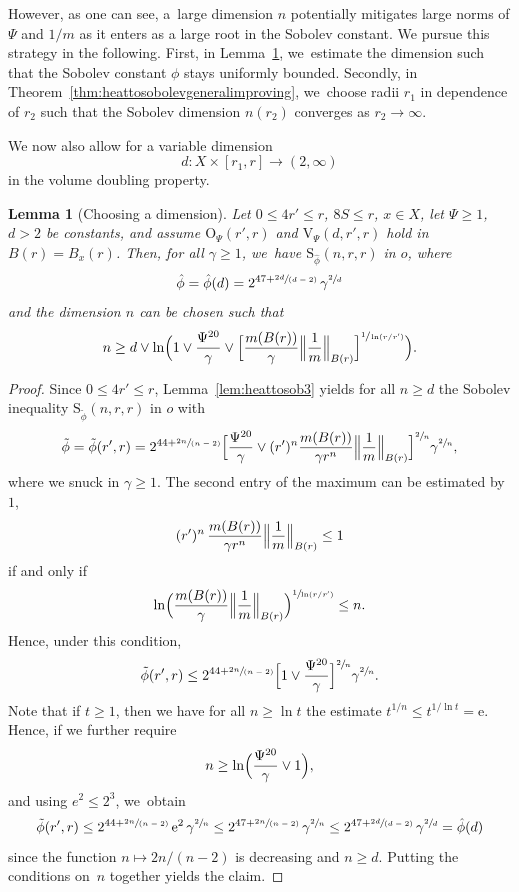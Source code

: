 \documentclass[JEP,XML,SOM,Unicode,published]{cedram}
\newcommand{\spfrac}[2]{\sfrac{#1}{(#2)}}
\newcommand{\rS}{\mathrm{S}}
\newcommand{\rV}{\mathrm{V}}
\newcommand{\rO}{\mathrm{O}}
\theoremstyle{plain}
\newtheorem{lemma}[theorem]{Lemma}
\theoremstyle{definition}
\newcommand{\euler}{\mathrm{e}}
\begin{document}
However, as one can see, a~large dimension $ n $ potentially mitigates large norms of $ \Psi $ and $ 1/m $ as it enters as a large root in the Sobolev constant. We pursue this strategy in the following. First, in Lemma~\ref{lem:variabledim1}, we~estimate the dimension such that the Sobolev constant $ \phi $ stays uniformly bounded. Secondly, in Theorem~\ref{thm:heattosobolevgeneralimproving}, we~choose radii $ r_{1} $ in dependence of $ r_{2} $ such that the Sobolev dimension $ n(r_{2}) $ converges as $ r_{2}\to \infty $.

We now also allow for a variable dimension
\[
d\colon X\times [r_1,r]\to (2,\infty)
\]
in the volume doubling property.

\begin{lemma}[Choosing a dimension]\label{lem:variabledim1}Let
$0\leq {4}r'\leq r$, $8S\leq r$, $ x\in X $, let $\Psi\geq 1$, $d>2$ be constants, and assume $\rO_\Psi(r',r)$ and
$\rV_\Psi (d,r',r)$ hold in $B(r)=B_{x}(r)$.
Then, for all $\gamma\geq 1$, we~have $\rS_{\hat \phi}(n,r,r)$ in $o$, where
\[
\hat{\phi}=\hat{\phi}(d)=2^{47+\spfrac{2d}{d-2}}\,
\gamma^{\sfrac{2}{d}}
\]
and the dimension $ n $ can be chosen such that
\[
n\geq d\vee
\ln
\Bigl(1\vee
\frac{\Psi^{20}}{\gamma}\vee
\Bigl[\frac{m(B(r))}{\gamma} \Bigl\|\frac1m \Bigr\|_{B(r)}
\Bigr]^{\sfrac{1}{\ln ({r}/{r'})}}
\Bigr).
\]
\end{lemma}

\begin{proof}
Since $0\leq {4}r'\leq r$, Lemma~\ref{lem:heattosob3}
yields for all $n\geq d$ the Sobolev inequality $\rS_{\tilde{\phi}}(n,r,r)$ in $o$ with
\[
\tilde{\phi}=\tilde{\phi}(r',r)=2^{44+\spfrac{2n}{n-2}}
\Bigl[\frac{\Psi^{20}}\gamma\vee (r')^n\frac{m(B(r))}{\gamma r^{n}} \Bigl\Vert\frac1m \Bigr\Vert_{B(r)} \Bigr]^{\sfrac{2}{n}}\gamma^{\sfrac{2}{n}},
\]
where we snuck in $\gamma\geq 1$. The second entry of the maximum can be estimated by~$1$,~\ie
\[
(r')^n\,\frac{m(B(r))}{\gamma r^n} \Bigl\Vert\frac1m \Bigr\Vert_{B(r)}\leq 1
\]
if and only if
\[
\ln \Bigl(\frac{m(B(r))}\gamma\Bigl\Vert\frac1m\Bigr\Vert_{B(r)}\Bigr)^{\sfrac{1}{{\ln ({r}/{r'})}}}\leq n.
\]
Hence, under this condition,
\[
\tilde\phi(r',r)\leq 2^{44+\spfrac{2n}{n-2}}
\Bigl[1\vee \frac{\Psi^{20}}\gamma\Bigr]^{\sfrac{2}{n}}\gamma^{\sfrac{2}{n}}.
\]
Note that if $t\geq 1$, then we have for all $n\geq \ln t$ the estimate $t^{1/n}\leq t^{1/\ln t}=\euler$. Hence, if we further require
\[
n\geq \ln\Bigl(\frac{\Psi^{20}}\gamma\vee 1\Bigr),
\]
and using $e^2\leq 2^3$, we~obtain
\[
\tilde{\phi}(r',r)\leq 2^{44+\spfrac{2n}{n-2}}\,
\euler^2\,\gamma^{\sfrac{2}{n}}\leq 2^{47+\spfrac{2n}{n-2}}\,
\gamma^{\sfrac{2}{n}}\leq 2^{47+\spfrac{2d}{d-2}}\,
\gamma^{\sfrac{2}{d}}=\hat{\phi}(d)
\]
since the function $ n\mapsto 2n/(n-2) $ is decreasing and $ n\ge d $.
Putting the conditions on~$n$ together yields the claim.
\end{proof}
\end{document}
